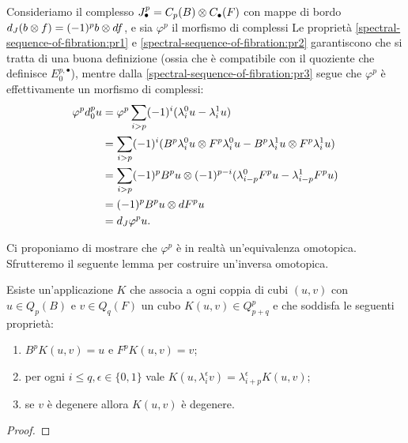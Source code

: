 Consideriamo il complesso $J^p_\bullet=C_p(B)\mathbin{\otimes} C_\bullet(F)$ con mappe di bordo $d_J(b\mathbin{\otimes} f)=(-1)^pb\mathbin{\otimes} df$, e sia $\varphi^p$ il morfismo di complessi
Le proprietà \ref{spectral-sequence-of-fibration:pr1} e \ref{spectral-sequence-of-fibration:pr2} garantiscono che si tratta di una buona definizione (ossia che è compatibile con il quoziente che definisce $E^{p,\bullet}_0$), mentre dalla \ref{spectral-sequence-of-fibration:pr3} segue che $\varphi^p$ è effettivamente un morfismo di complessi:
\begin{align*}
\varphi^pd^p_0u&=\varphi^p\sum_{i>p}(-1)^i(\lambda^0_iu-\lambda^1_iu)\\
&=\sum_{i>p}(-1)^i(B^p\lambda^0_iu\mathbin{\otimes} F^p\lambda^0_iu-B^p\lambda^1_iu\mathbin{\otimes} F^p\lambda^1_iu)\\
&=\sum_{i>p}(-1)^pB^pu\mathbin{\otimes}(-1)^{p-i}(\lambda^0_{i-p}F^pu-\lambda^1_{i-p}F^pu)\\
&=(-1)^pB^pu\mathbin{\otimes} dF^pu\\
&=d_J\varphi^pu.
\end{align*}

Ci proponiamo di mostrare che $\varphi^p$ è in realtà un'equivalenza omotopica. Sfrutteremo il seguente lemma per costruire un'inversa omotopica.

\begin{lemma}
Esiste un'applicazione $K$ che associa a ogni coppia di cubi $(u,v)$ con $u\in Q_p(B)$ e $v\in Q_q(F)$ un cubo $K(u,v)\in Q^p_{p+q}$ e che soddisfa le seguenti proprietà:
\begin{enumerate}
\item\label{spectral-sequence-of-fibration-psi-construction:pr1} $B^pK(u,v)=u$ e $F^pK(u,v)=v$;
\item\label{spectral-sequence-of-fibration-psi-construction:pr2} per ogni $i\le q,\epsilon\in\{0,1\}$ vale $K(u,\lambda^\epsilon_iv)=\lambda^\epsilon_{i+p}K(u,v)$;
\item\label{spectral-sequence-of-fibration-psi-construction:pr3} se $v$ è degenere allora $K(u,v)$ è degenere.
\end{enumerate}
\end{lemma}
\begin{proof}

\end{proof}

